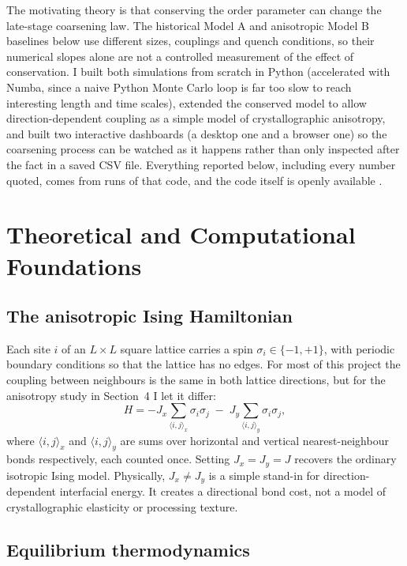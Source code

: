 \documentclass[11pt]{article}
\begin{document}
The motivating theory is that conserving the order parameter can change
the late-stage coarsening law. The historical Model A and anisotropic Model B
baselines below use different sizes, couplings and quench conditions, so
their numerical slopes alone are not a controlled measurement of the
effect of conservation. I built both simulations from scratch in
Python (accelerated with Numba, since a naive Python Monte Carlo loop is
far too slow to reach interesting length and time scales), extended the
conserved model to allow direction-dependent coupling as a simple model of
crystallographic anisotropy, and built two interactive dashboards (a
desktop one and a browser one) so the coarsening process can be watched as
it happens rather than only inspected after the fact in a saved CSV file.
Everything reported below, including every number quoted, comes from
runs of that code, and the code itself is openly available
\cite{CodeRepo}.

\section{Theoretical and Computational Foundations}

\subsection{The anisotropic Ising Hamiltonian}

Each site $i$ of an $L\times L$ square lattice carries a spin
$\sigma_i \in \{-1,+1\}$, with periodic boundary conditions so that the
lattice has no edges. For most of this project the coupling between
neighbours is the same in both lattice directions, but for the anisotropy
study in Section~4 I let it differ:
\begin{equation}
H = -J_x \sum_{\langle i,j\rangle_x} \sigma_i \sigma_j \;-\; J_y \sum_{\langle i,j\rangle_y} \sigma_i \sigma_j,
\label{eq:hamiltonian}
\end{equation}
where $\langle i,j\rangle_x$ and $\langle i,j\rangle_y$ are sums over
horizontal and vertical nearest-neighbour bonds respectively, each counted
once. Setting $J_x = J_y = J$ recovers the ordinary isotropic Ising model.
Physically, $J_x \neq J_y$ is a simple stand-in for direction-dependent
interfacial energy. It creates a directional bond cost, not a model of
crystallographic elasticity or processing texture.

\subsection{Equilibrium thermodynamics}
\end{document}

